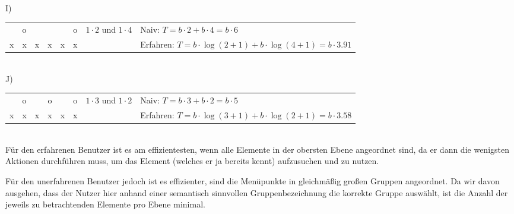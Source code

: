\documentclass[a4paper,10pt]{article}
\begin{document}
I)\\
\begin{tabular}{|c|c|c|c|c|c|l|l}
\cline{1-6}   & o &   &   &   & o & $1\cdot 2$ und $1\cdot 4$ & Naiv: $T = b\cdot 2+b\cdot 4 = b\cdot 6$ \\
\cline{1-6} x & x & x & x & x & x &   & Erfahren: $T = b\cdot \log(2+1)+b\cdot \log(4+1) = b\cdot 3.91$ \\
\cline{1-6}
\end{tabular} \\

J)\\
\begin{tabular}{|c|c|c|c|c|c|l|l}
\cline{1-6}   & o &   & o &   & o & $1\cdot 3$ und $1\cdot 2$ & Naiv: $T = b\cdot 3+b\cdot 2 = b\cdot 5$ \\
\cline{1-6} x & x & x & x & x & x &   & Erfahren: $T = b\cdot \log(3+1)+b\cdot \log(2+1) = b\cdot 3.58$ \\
\cline{1-6}
\end{tabular} \\

Für den erfahrenen Benutzer ist es am effizientesten, wenn alle Elemente in der obersten Ebene angeordnet sind, da er dann die wenigsten Aktionen durchführen muss, um das Element (welches er ja bereits kennt) aufzusuchen und zu nutzen.

Für den unerfahrenen Benutzer jedoch ist es effizienter, sind die Menüpunkte in gleichmäßig großen Gruppen angeordnet. Da wir davon ausgehen, dass der Nutzer hier anhand einer semantisch sinnvollen Gruppenbezeichnung die korrekte Gruppe auswählt, ist die Anzahl der jeweils zu betrachtenden Elemente pro Ebene minimal.
\end{document}
